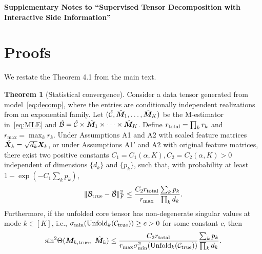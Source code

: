 \documentclass[12pt]{article}
\theoremstyle{definition}
\newtheorem{thm}{Theorem}[section]
\theoremstyle{definition}
\begin{document}
\def\spacingset#1{\renewcommand{\baselinestretch}%
{#1}\small\normalsize} \spacingset{1.5}



\begin{center}
{\Large\bf Supplementary Notes to ``Supervised Tensor Decomposition
with Interactive Side Information''}
\end{center}

\appendix
\renewcommand{\thefigure}{S\arabic{figure}}
\setcounter{figure}{0}   

\section{Proofs}\label{sec:appedix}
We restate the Theorem 4.1 from the main text. 
 \begin{thm}[Statistical convergence]\label{thm:main}
Consider a data tensor generated from model~\eqref{eq:decomp}, where the entries are conditionally independent realizations from an exponential family. Let $(\hat {\mathcal{C}}, \hat {\bm M}_1,\ldots,\hat {\bm M}_K)$ be the M-estimator in~\eqref{eq:MLE} and $\hat {\mathcal{B}}=\hat {\mathcal{C}}\times \hat {\bm M}_1\times\cdots \times \hat {\bm M}_K$. Define $r_\textup{total}=\prod_k r_k$ and $r_{\max}=\max_k r_k$. Under Assumptions A1 and A2 with scaled feature matrices $\check {\bm X}_k= \sqrt{d_k}\bm X_k$, or under Assumptions A1' and A2 with original feature matrices, there exist two positive constants $C_1=C_1(\alpha,K), C_2=C_2(\alpha, K)>0$ independent of dimensions $\{d_k\}$ and $\{p_k\}$, such that, with probability at least $1-\exp(-C_1\sum_k p_k)$, 
\begin{equation}\label{eq:bound}
    \lVert\mathcal{B}_{\textup{true}}- \hat {\mathcal{B}}\rVert_F^2\leq \frac{ C_{2} r_{\textup{total}}}{r_{\max}}\frac{\sum_k p_k}{\prod_k d_k}.
\end{equation}
Furthermore, if the unfolded core tensor has non-degenerate singular values at mode $k\in[K]$, i.e., $\sigma_{\min}(\textup{Unfold}_k(\mathcal{C}_\textup{true})) \geq c>0$ for some constant $c$, then
\begin{equation}\label{eq:sinebound}
\textup{sin}^2 \Theta(\bm M_{k,\textup{true}},\ \hat {\bm M}_k) \leq  \frac{ C_{2}r_{\textup{total}}}{ r_{\max}\sigma^2_{\min}(\textup{Unfold}_k(\mathcal{C}_\textup{true}))}\frac{\sum_k p_k}{\prod_k d_k}.
\end{equation}
\end{thm}
\end{document}
